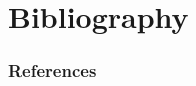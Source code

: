 \documentclass{beamer}
\begin{document}
\section{Bibliography}
\begin{frame}[plain]
  \nocite{*} 
  \frametitle{References}
  
  \begin{multicols}{2}
    \tiny
  \end{multicols}
\end{frame}

\end{document}
